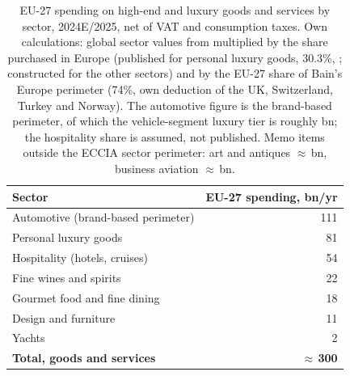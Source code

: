 \providecommand{\EUR}[1]{\mbox{\texteuro#1}}

\begin{table}[ht]
\centering
\begin{tabular}{lr}
\hline\hline
Sector & EU-27 spending, \EUR{}bn/yr \\
\hline
Automotive (brand-based perimeter) & 111 \\
Personal luxury goods              & 81  \\
Hospitality (hotels, cruises)      & 54  \\
Fine wines and spirits             & 22  \\
Gourmet food and fine dining       & 18  \\
Design and furniture               & 11  \\
Yachts                             & 2   \\
\hline
\textbf{Total, goods and services} & \textbf{$\approx$\,300} \\
\hline\hline
\end{tabular}
\caption{EU-27 spending on high-end and luxury goods and services by sector,
2024E/2025, net of VAT and consumption taxes. Own calculations: global sector
values from \citet{ECCIA2025} multiplied by the share purchased in Europe
(published for personal luxury goods, 30.3\%, \citealp{BainAltagamma2024};
constructed for the other sectors) and by the EU-27 share of Bain's Europe
perimeter (74\%, own deduction of the UK, Switzerland, Turkey and Norway).
The automotive figure is the brand-based perimeter, of which the
vehicle-segment luxury tier is roughly \EUR{20}bn; the hospitality share is
assumed, not published. Memo items outside the ECCIA sector perimeter: art
and antiques $\approx$\,\EUR{5}bn, business aviation $\approx$\,\EUR{2}bn.}
\label{tab:eu27sectors}
\end{table}
